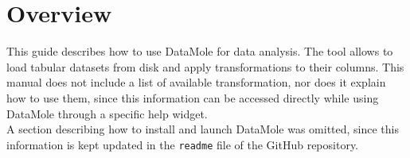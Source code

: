 \usepackage[backend=biber,style=numeric-comp,hyperref,backref]{biblatex}

\usepackage[capitalise]{cleveref}




\graphicspath{{./images/user-manual/}{./images/}}
\maketitle


\section{Overview}

This guide describes how to use DataMole for data analysis. The tool allows to load tabular datasets from disk and apply transformations to their columns. This manual does not include a list of available transformation, nor does it explain how to use them, since this information can be accessed directly while using DataMole through a specific help widget.\\
A section describing how to install and launch DataMole was omitted, since this information is kept updated in the \texttt{readme} file of the GitHub repository.

